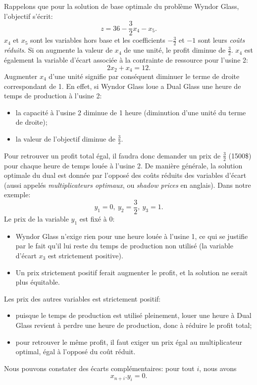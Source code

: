 \begin{example}
Rappelons que pour la solution de base optimale du problème Wyndor Glass, l'objectif s'écrit:
\[
z = 36 - \frac{3}{2}x_4 - x_5.
\]
$x_4$ et $x_5$ sont les variables hors base et les coefficients $-\frac{3}{2}$ et $-1$ sont leurs {\sl coûts réduits}.
Si on augmente la valeur de $x_4$ de une unité, le profit diminue de $\frac{3}{2}$.
$x_4$ est également la variable d'écart associée à la contrainte de ressource pour l'usine 2:
\[
2x_2+x_4 = 12.
\]
Augmenter $x_4$ d'une unité signifie par conséquent diminuer le terme de droite correspondant de 1.
En effet, si Wyndor Glass loue a Dual Glass une heure de temps de production à l'usine 2:
\begin{itemize}
\item
la capacité à l'usine 2 diminue de 1 heure (diminution d'une unité du terme de droite);
\item
la valeur de l'objectif diminue de $\frac{3}{2}$.
\end{itemize}
Pour retrouver un profit total égal, il faudra donc demander un prix de $\frac{3}{2}$ (1500\$) pour chaque heure de temps louée à l'usine 2.
De manière générale, la solution optimale du dual est donnée par l'opposé des coûts réduits des variables d'écart (aussi appelés {\sl multiplicateurs optimaux}, ou {\sl shadow prices} en anglais).
Dans notre exemple:
\[
  y_1 = 0,\ y_2 = \frac{3}{2},\ y_3 = 1.
\]
Le prix de la variable $y_1$ est fixé à 0:
\begin{itemize}
\item
Wyndor Glass n'exige rien pour une heure louée à l'usine 1, ce qui se justifie par le fait qu'il lui reste du temps de production non utilisé (la variable d'écart $x_3$ est strictement positive).
\item
Un prix strictement positif ferait augmenter le profit, et la solution ne serait plus équitable.
\end{itemize}
Les prix des autres variables est strictement positif:
\begin{itemize}
\item
puisque le temps de production est utilisé pleinement, louer une heure à Dual Glass revient à perdre une heure de production, donc à réduire le profit total;
\item
pour retrouver le même profit, il faut exiger un prix égal au multiplicateur optimal, égal à l'opposé du coût réduit.
\end{itemize}
Nous pouvons constater des écarts complémentaires: pour tout $i$, nous avons
\[
  x_{n+i}.y_i = 0.
\]
\end{example}

